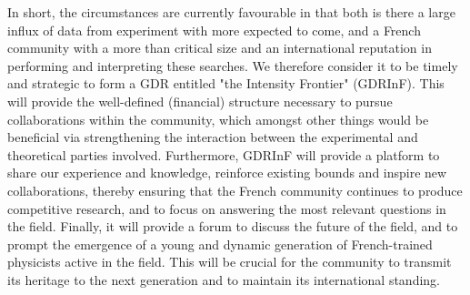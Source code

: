 In short, the circumstances are currently favourable in that both is there a large influx of data from experiment with more expected to come, and a French community with a more than critical size and an international reputation in performing and interpreting these searches. We therefore consider it to be timely and strategic to form a GDR entitled "the Intensity Frontier" (GDRInF). This  will provide the well-defined (financial) structure necessary to pursue collaborations within the community, which amongst other things would be beneficial via strengthening the interaction between the experimental and theoretical parties involved. Furthermore, GDRInF will provide a platform to share our experience and knowledge, reinforce existing bounds and inspire new collaborations, thereby ensuring that the French community continues to produce competitive research, and to focus on answering the most relevant questions in the field. Finally, it will provide a forum to discuss the future of the field, and to prompt the emergence of a young and dynamic generation of French-trained physicists active in the field. This will be crucial for the community to transmit its heritage to the next generation and to maintain its international standing.
